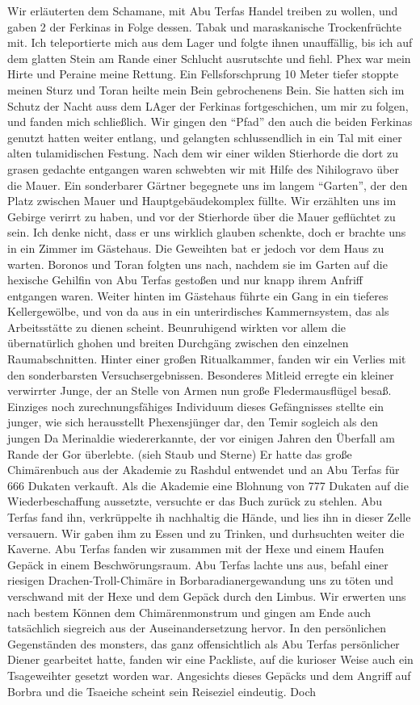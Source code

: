 Wir erläuterten dem Schamane, mit Abu Terfas Handel treiben zu wollen, und gaben 2 der Ferkinas in Folge dessen. Tabak und maraskanische Trockenfrüchte mit. Ich teleportierte mich aus dem Lager und folgte ihnen unauffällig, bis ich auf dem glatten Stein am Rande einer Schlucht ausrutschte und fiehl. Phex war mein Hirte und Peraine meine Rettung. Ein Fellsforschprung 10 Meter tiefer stoppte meinen Sturz und Toran heilte mein Bein gebrochenens Bein. Sie hatten sich im Schutz der Nacht auss dem LAger der Ferkinas fortgeschichen, um mir zu folgen, und fanden mich schließlich. Wir gingen den ``Pfad'' den auch die beiden Ferkinas genutzt hatten weiter entlang, und gelangten schlussendlich in ein Tal mit einer alten tulamidischen Festung. Nach dem wir einer wilden Stierhorde die dort zu grasen gedachte entgangen waren schwebten wir mit Hilfe des Nihilogravo über die Mauer. Ein sonderbarer Gärtner begegnete uns im langem ``Garten'', der den Platz zwischen Mauer und Hauptgebäudekomplex füllte. Wir erzählten uns im Gebirge verirrt zu haben, und vor der Stierhorde über die Mauer geflüchtet zu sein. Ich denke nicht, dass er uns wirklich glauben schenkte, doch er brachte uns in ein Zimmer im Gästehaus. Die Geweihten bat er jedoch vor dem Haus zu warten. Boronos und Toran folgten uns nach, nachdem sie im Garten auf die hexische Gehilfin von Abu Terfas gestoßen und nur knapp ihrem Anfriff entgangen waren. Weiter hinten im Gästehaus führte ein Gang in ein tieferes Kellergewölbe, und von da aus in ein unterirdisches Kammernsystem, das als Arbeitsstätte zu dienen scheint. Beunruhigend wirkten vor allem die übernatürlich ghohen und breiten Durchgäng zwischen den einzelnen Raumabschnitten. Hinter einer großen Ritualkammer, fanden wir ein Verlies mit den sonderbarsten Versuchsergebnissen. Besonderes Mitleid erregte ein kleiner verwirrter Junge, der an Stelle von Armen nun große Fledermausflügel besaß. Einziges noch zurechnungsfähiges Individuum dieses Gefängnisses stellte ein junger, wie sich herausstellt Phexensjünger dar, den Temir sogleich als den jungen Da Merinaldie wiedererkannte, der vor einigen Jahren den Überfall am Rande der Gor überlebte. (sieh Staub und Sterne) Er hatte das große Chimärenbuch aus der Akademie zu Rashdul entwendet und an Abu Terfas für 666 Dukaten verkauft. Als die Akademie eine Blohnung von 777 Dukaten auf die Wiederbeschaffung aussetzte, versuchte er das Buch zurück zu stehlen. Abu Terfas fand ihn, verkrüppelte ih nachhaltig die Hände, und lies ihn in dieser Zelle versauern. Wir gaben ihm zu Essen und zu Trinken, und durhsuchten weiter die Kaverne. Abu Terfas fanden wir zusammen mit der Hexe und einem Haufen Gepäck in einem Beschwörungsraum. Abu Terfas lachte uns aus, befahl einer riesigen Drachen-Troll-Chimäre in Borbaradianergewandung uns zu töten und verschwand mit der Hexe und dem Gepäck durch den Limbus. Wir erwerten uns nach bestem Können dem Chimärenmonstrum und gingen am Ende auch tatsächlich siegreich aus der Auseinandersetzung hervor. In den persönlichen Gegenständen des monsters, das ganz offensichtlich als Abu Terfas persönlicher Diener gearbeitet hatte, fanden wir eine Packliste, auf die kurioser Weise auch ein Tsageweihter gesetzt worden war. Angesichts dieses Gepäcks und dem Angriff auf Borbra und die Tsaeiche scheint sein Reiseziel eindeutig. Doch 